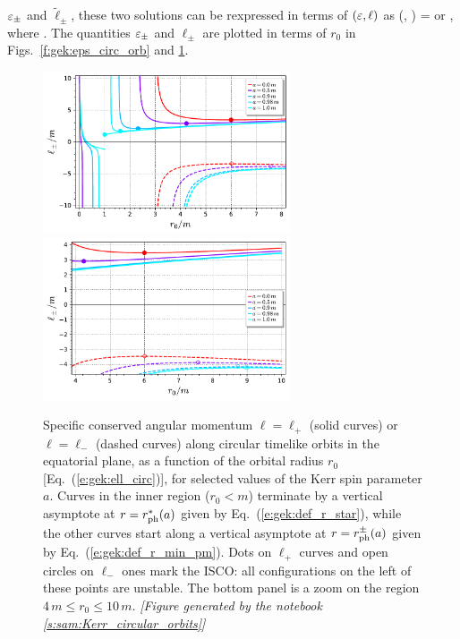 $\varepsilon_\pm$ and $\tilde{\ell}_\pm$, these two solutions
can be rexpressed in terms of $(\varepsilon,\ell)$ as
\be \label{e:gek:circ_two_sol}
    (\veps, \ell) = \encadre{ (\veps_+, \ell_+)}\quad\mbox{or}\quad
    \encadre{(\veps_-, \ell_-)} ,
\ee
where
\be \label{e:gek:ell_circ}
     .
\ee
The quantities $\varepsilon_\pm$ and $\ell_\pm$ are plotted in terms of $r_0$ in
Figs.~\ref{f:gek:eps_circ_orb} and \ref{f:gek:ell_circ_orb}.
\begin{figure}
\begin{center}
\includegraphics[width=0.65\textwidth]{gek_ell_circ_orb.pdf}\\
\includegraphics[width=0.65\textwidth]{gek_ell_circ_orb_zoom.pdf}
\end{center}
\caption[]{\label{f:gek:ell_circ_orb} \footnotesize
Specific conserved angular momentum $\ell=\ell_+$ (solid curves) or $\ell=\ell_-$
(dashed curves) along circular timelike
orbits in the equatorial plane, as a function of the orbital radius $r_0$
[Eq.~(\ref{e:gek:ell_circ})], for selected values of the Kerr spin parameter $a$.
Curves in the inner region ($r_0 < m$) terminate by a vertical asymptote at $r = r_{\rm ph}^*(a)$ given
by Eq.~(\ref{e:gek:def_r_star}), while the other curves start along a
vertical asymptote at $r = r_{\rm ph}^\pm(a)$ given by Eq.~(\ref{e:gek:def_r_min_pm}).
Dots on $\ell_+$ curves and open circles on $\ell_-$ ones mark the ISCO: all
configurations on the left of these points are unstable.
The bottom panel is a zoom on the region $4\,m \leq r_0 \leq 10\,m$.
\textsl{[Figure generated by the notebook \ref{s:sam:Kerr_circular_orbits}]}
}
\end{figure}
